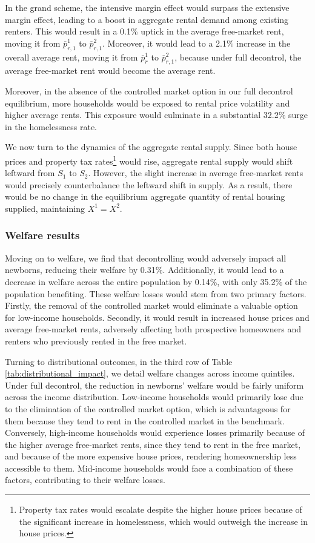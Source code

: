 \documentclass[parskip=full]{article}
\begin{document}
In the grand scheme, the intensive margin effect would surpass the extensive margin effect, leading to a boost in aggregate rental demand among existing renters. This would result in a 0.1\% uptick in the average free-market rent, moving it from $\overline{p}^{1}_{r,1}$ to $\overline{p}^{2}_{r,1}$. Moreover, it would lead to a 2.1\% increase in the overall average rent, moving it from $\overline{p}^{1}_{r}$ to $\overline{p}^{2}_{r,1}$, because under full decontrol, the average free-market rent would become the average rent.

Moreover, in the absence of the controlled market option in our full decontrol equilibrium, more households would be exposed to rental price volatility and higher average rents. This exposure would culminate in a substantial 32.2\% surge in the homelessness rate.

We now turn to the dynamics of the aggregate rental supply. Since both house prices and property tax rates\footnote{Property tax rates would escalate despite the higher house prices because of the significant increase in homelessness, which would outweigh the increase in house prices.} would rise, aggregate rental supply would shift leftward from $S_{1}$ to $S_{2}$. However, the slight increase in average free-market rents would precisely counterbalance the leftward shift in supply. As a result, there would be no change in the equilibrium aggregate quantity of rental housing supplied, maintaining $X^{1}=X^{2}$.

\subsubsection{Welfare results}

Moving on to welfare, we find that decontrolling would adversely impact all newborns, reducing their welfare by 0.31\%. Additionally, it would lead to a decrease in welfare across the entire population by 0.14\%, with only 35.2\% of the population benefiting. These welfare losses would stem from two primary factors. Firstly, the removal of the controlled market would eliminate a valuable option for low-income households. Secondly, it would result in increased house prices and average free-market rents, adversely affecting both prospective homeowners and renters who previously rented in the free market.

Turning to distributional outcomes, in the third row of Table \ref{tab:distributional_impact}, we detail welfare changes across income quintiles. Under full decontrol, the reduction in newborns' welfare would be fairly uniform across the income distribution. Low-income households would primarily lose due to the elimination of the controlled market option, which is advantageous for them because they tend to rent in the controlled market in the benchmark. Conversely, high-income households would experience losses primarily because of the higher average free-market rents, since they tend to rent in the free market, and because of the more expensive house prices, rendering homeownership less accessible to them. Mid-income households would face a combination of these factors, contributing to their welfare losses.
\end{document}
